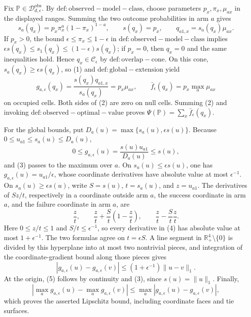Fix \(\mathbb P\in\mathcal D_{d,\epsilon}^{\mathrm{obs}}\).  By \(\mathrm{def:observed-model-class}\), choose parameters \(p_x,\pi_x,\mu_{ax}\) in the displayed ranges.  Summing the two outcome probabilities in arm \(a\) gives
\[
 s_a(q_x)=p_x\pi_x^a(1-\pi_x)^{1-a},\qquad s(q_x)=p_x,
 \qquad q_{a1,x}=s_a(q_x)\mu_{ax}.                                  \tag{1}
\]
If \(p_x>0\), the bound \(\epsilon\leq\pi_x\leq1-\epsilon\) in \(\mathrm{def:observed-model-class}\) implies
\(\epsilon s(q_x)\leq s_1(q_x)\leq(1-\epsilon)s(q_x)\); if \(p_x=0\), then \(q_x=0\) and the same inequalities hold.  Hence \(q_x\in\mathcal C_\epsilon\) by \(\mathrm{def:overlap-cone}\).  On this cone, \(s_a(q_x)\geq\epsilon s(q_x)\), so (1) and \(\mathrm{def:global-extension}\) yield
\[
 g_{a,\epsilon}(q_x)=\frac{s(q_x)q_{a1,x}}{s_a(q_x)}=p_x\mu_{ax},
 \qquad \bar f_\epsilon(q_x)=p_x\max_a\mu_{ax}                    \tag{2}
\]
on occupied cells.  Both sides of (2) are zero on null cells.  Summing (2) and invoking \(\mathrm{def:observed-optimal-value}\) proves \(\Psi(\mathbb P)=\sum_x\bar f_\epsilon(q_x)\).

For the global bounds, put \(D_a(u)=\max\{s_a(u),\epsilon s(u)\}\).  Because \(0\leq u_{a1}\leq s_a(u)\leq D_a(u)\),
\[
 0\leq g_{a,\epsilon}(u)=\frac{s(u)u_{a1}}{D_a(u)}\leq s(u),        \tag{3}
\]
and (3) passes to the maximum over \(a\).  On \(s_a(u)\leq\epsilon s(u)\), one has \(g_{a,\epsilon}(u)=u_{a1}/\epsilon\), whose coordinate derivatives have absolute value at most \(\epsilon^{-1}\).  On \(s_a(u)\geq\epsilon s(u)\), write \(S=s(u)\), \(t=s_a(u)\), and \(z=u_{a1}\).  The derivatives of \(Sz/t\), respectively in a coordinate outside arm \(a\), the success coordinate in arm \(a\), and the failure coordinate in arm \(a\), are
\[
 \frac zt,\qquad \frac zt+\frac St\left(1-\frac zt\right),
 \qquad \frac zt-\frac St\frac zt.                                \tag{4}
\]
Here \(0\leq z/t\leq1\) and \(S/t\leq\epsilon^{-1}\), so every derivative in (4) has absolute value at most \(1+\epsilon^{-1}\).  The two formulas agree on \(t=\epsilon S\).  A line segment in \(\mathbb R_+^4\setminus\{0\}\) is divided by this hyperplane into at most two nontrivial pieces, and integration of the coordinate-gradient bound along those pieces gives
\[
 |g_{a,\epsilon}(u)-g_{a,\epsilon}(v)|
 \leq(1+\epsilon^{-1})\lVert u-v\rVert_1.                           \tag{5}
\]
At the origin, (5) follows by continuity and (3), since \(s(u)=\lVert u\rVert_1\).  Finally,
\[
 |\max_a g_{a,\epsilon}(u)-\max_a g_{a,\epsilon}(v)|
 \leq\max_a|g_{a,\epsilon}(u)-g_{a,\epsilon}(v)|,
\]
which proves the asserted Lipschitz bound, including coordinate faces and tie surfaces.

